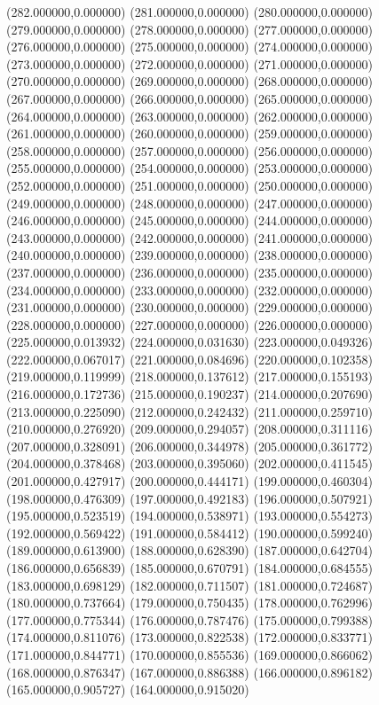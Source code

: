 {(282.000000,0.000000)
(281.000000,0.000000)
(280.000000,0.000000)
(279.000000,0.000000)
(278.000000,0.000000)
(277.000000,0.000000)
(276.000000,0.000000)
(275.000000,0.000000)
(274.000000,0.000000)
(273.000000,0.000000)
(272.000000,0.000000)
(271.000000,0.000000)
(270.000000,0.000000)
(269.000000,0.000000)
(268.000000,0.000000)
(267.000000,0.000000)
(266.000000,0.000000)
(265.000000,0.000000)
(264.000000,0.000000)
(263.000000,0.000000)
(262.000000,0.000000)
(261.000000,0.000000)
(260.000000,0.000000)
(259.000000,0.000000)
(258.000000,0.000000)
(257.000000,0.000000)
(256.000000,0.000000)
(255.000000,0.000000)
(254.000000,0.000000)
(253.000000,0.000000)
(252.000000,0.000000)
(251.000000,0.000000)
(250.000000,0.000000)
(249.000000,0.000000)
(248.000000,0.000000)
(247.000000,0.000000)
(246.000000,0.000000)
(245.000000,0.000000)
(244.000000,0.000000)
(243.000000,0.000000)
(242.000000,0.000000)
(241.000000,0.000000)
(240.000000,0.000000)
(239.000000,0.000000)
(238.000000,0.000000)
(237.000000,0.000000)
(236.000000,0.000000)
(235.000000,0.000000)
(234.000000,0.000000)
(233.000000,0.000000)
(232.000000,0.000000)
(231.000000,0.000000)
(230.000000,0.000000)
(229.000000,0.000000)
(228.000000,0.000000)
(227.000000,0.000000)
(226.000000,0.000000)
(225.000000,0.013932)
(224.000000,0.031630)
(223.000000,0.049326)
(222.000000,0.067017)
(221.000000,0.084696)
(220.000000,0.102358)
(219.000000,0.119999)
(218.000000,0.137612)
(217.000000,0.155193)
(216.000000,0.172736)
(215.000000,0.190237)
(214.000000,0.207690)
(213.000000,0.225090)
(212.000000,0.242432)
(211.000000,0.259710)
(210.000000,0.276920)
(209.000000,0.294057)
(208.000000,0.311116)
(207.000000,0.328091)
(206.000000,0.344978)
(205.000000,0.361772)
(204.000000,0.378468)
(203.000000,0.395060)
(202.000000,0.411545)
(201.000000,0.427917)
(200.000000,0.444171)
(199.000000,0.460304)
(198.000000,0.476309)
(197.000000,0.492183)
(196.000000,0.507921)
(195.000000,0.523519)
(194.000000,0.538971)
(193.000000,0.554273)
(192.000000,0.569422)
(191.000000,0.584412)
(190.000000,0.599240)
(189.000000,0.613900)
(188.000000,0.628390)
(187.000000,0.642704)
(186.000000,0.656839)
(185.000000,0.670791)
(184.000000,0.684555)
(183.000000,0.698129)
(182.000000,0.711507)
(181.000000,0.724687)
(180.000000,0.737664)
(179.000000,0.750435)
(178.000000,0.762996)
(177.000000,0.775344)
(176.000000,0.787476)
(175.000000,0.799388)
(174.000000,0.811076)
(173.000000,0.822538)
(172.000000,0.833771)
(171.000000,0.844771)
(170.000000,0.855536)
(169.000000,0.866062)
(168.000000,0.876347)
(167.000000,0.886388)
(166.000000,0.896182)
(165.000000,0.905727)
(164.000000,0.915020)
}
